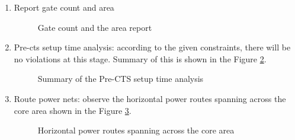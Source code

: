 \documentclass[a4paper,11pt]{article}%
\begin{document}
\begin{enumerate}[1.)]
	\item  Report gate count and area
	\begin{figure}[H]
		\centering
		\caption{Gate count and the area report}
		\label{fig:gateCount}
	\end{figure}
	
	\item Pre-\ac{cts} setup time analysis: according to the given constraints,  there will be no violations at this stage. Summary of this is shown in the Figure \ref{fig:timeDesign}.
	
	\begin{figure}[H]
		\centering
		\caption{Summary of the Pre-CTS setup time analysis}
		\label{fig:timeDesign}
	\end{figure} 
	
	
	\item Route power nets: observe the horizontal power routes spanning across the core area shown in the Figure \ref{fig:innovus_8_1}.
	\begin{figure}[H]
		\centering
		\caption{Horizontal power routes spanning across the core area}
		\label{fig:innovus_8_1}
	\end{figure}


\end{enumerate}
\end{document}
